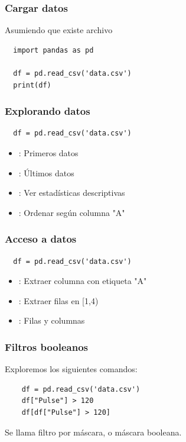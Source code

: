 \documentclass[14pt,aspectratio=169,xcolor=dvipsnames]{beamer}
\begin{document}
\begin{frame}[fragile]\frametitle{Cargar datos}

    Asumiendo que existe archivo 
    \begin{verbatim}
  import pandas as pd

  df = pd.read_csv('data.csv')
  print(df)
    \end{verbatim}

\end{frame}
\begin{frame}[fragile]\frametitle{Explorando datos}
    \begin{verbatim}
  df = pd.read_csv('data.csv')
    \end{verbatim}
    \begin{itemize}
        \item {}: Primeros  datos
        \item {}: Últimos  datos
        \item {}: Ver estadísticas descriptivas
        \item {}: Ordenar según columna "A"
    \end{itemize}
    
\end{frame}
\begin{frame}[fragile]\frametitle{Acceso a datos}
    \begin{verbatim}
  df = pd.read_csv('data.csv')
    \end{verbatim}
    \begin{itemize}
        \item {}: Extraer columna con etiqueta "A"
        \item {}: Extraer filas en [1,4)
        \item {}: Filas y columnas
    \end{itemize}

\end{frame}
\begin{frame}[fragile]\frametitle{Filtros booleanos}

    Exploremos los siguientes comandos: 
    \begin{verbatim}
    df = pd.read_csv('data.csv')
    df["Pulse"] > 120
    df[df["Pulse"] > 120]
    \end{verbatim}

    \vspace{1cm}
    \pause Se llama filtro por máscara, o máscara booleana.
\end{frame}
\end{document}
